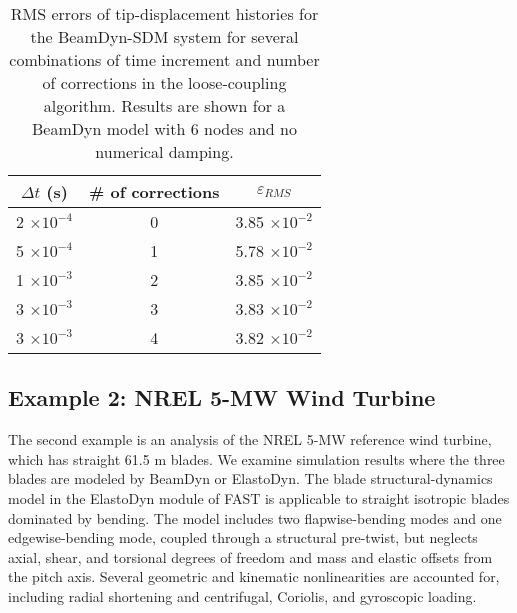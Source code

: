 \documentclass{aiaa-tc}
\begin{document}
\begin{table}[h!tp]
    \centering
    \begin{tabular}{| c | c | c |}
    \hline
    $\Delta t$ (s) & \# of corrections & $\varepsilon_{RMS}$ \\ \hline
    2 $\times 10^{-4}$ & 0 & 3.85 $\times 10^{-2}$ \\ \hline
    5 $\times 10^{-4}$ & 1 & 5.78 $\times 10^{-2}$ \\ \hline
    1 $\times 10^{-3}$ & 2 & 3.85 $\times 10^{-2}$ \\ \hline
    3 $\times 10^{-3}$ & 3 & 3.83 $\times 10^{-2}$ \\ \hline
    3 $\times 10^{-3}$ & 4 & 3.82 $\times 10^{-2}$ \\
    \hline
    \end{tabular}
    \caption{RMS errors of tip-displacement histories for the BeamDyn-SDM system for several combinations of time increment and number of corrections in the loose-coupling algorithm.  Results are shown for a BeamDyn model with 6 nodes and no numerical damping.}
    \label{tab:RMS_pc}
\end{table}


\subsection{Example 2: NREL 5-MW Wind Turbine}

The second example is an analysis of the NREL 5-MW reference wind turbine\cite{Jonkman-etal:2009}, which has straight 61.5 m blades.  
We examine simulation results where the three blades are modeled by BeamDyn or ElastoDyn.
The blade structural-dynamics model in the ElastoDyn module of FAST is applicable to straight isotropic blades dominated by bending.  The model includes two flapwise-bending modes and one edgewise-bending mode, coupled through a structural pre-twist, but neglects axial, shear, and torsional degrees of freedom and mass and elastic offsets from the pitch axis.  Several geometric and kinematic nonlinearities are accounted for, including radial shortening and centrifugal, Coriolis, and gyroscopic loading.
\end{document}
